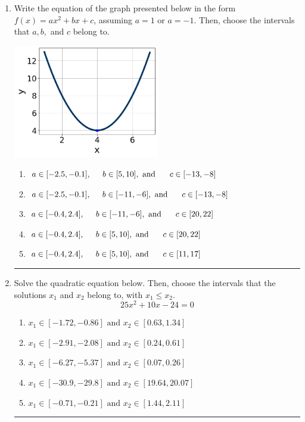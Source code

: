 \documentclass[14pt]{extbook}
\newcommand{\litem}[1]{\item#1\hspace*{-1cm}\rule{\textwidth}{0.4pt}}
\begin{document}
\begin{enumerate}
\litem{
Write the equation of the graph presented below in the form $f(x)=ax^2+bx+c$, assuming  $a=1$ or $a=-1$. Then, choose the intervals that $a, b,$ and $c$ belong to.
\begin{center}
    \includegraphics[width=0.5\textwidth]{../Figures/quadraticGraphToEquationB.png}
\end{center}
\begin{enumerate}[label=\Alph*.]
\item \( a \in [-2.5, -0.1], \hspace*{5mm} b \in [5, 10], \text{ and } \hspace*{5mm} c \in [-13, -8] \)
\item \( a \in [-2.5, -0.1], \hspace*{5mm} b \in [-11, -6], \text{ and } \hspace*{5mm} c \in [-13, -8] \)
\item \( a \in [-0.4, 2.4], \hspace*{5mm} b \in [-11, -6], \text{ and } \hspace*{5mm} c \in [20, 22] \)
\item \( a \in [-0.4, 2.4], \hspace*{5mm} b \in [5, 10], \text{ and } \hspace*{5mm} c \in [20, 22] \)
\item \( a \in [-0.4, 2.4], \hspace*{5mm} b \in [5, 10], \text{ and } \hspace*{5mm} c \in [11, 17] \)

\end{enumerate} }
\litem{
Solve the quadratic equation below. Then, choose the intervals that the solutions $x_1$ and $x_2$ belong to, with $x_1 \leq x_2$.\[ 25x^{2} +10 x -24 = 0 \]\begin{enumerate}[label=\Alph*.]
\item \( x_1 \in [-1.72, -0.86] \text{ and } x_2 \in [0.63, 1.34] \)
\item \( x_1 \in [-2.91, -2.08] \text{ and } x_2 \in [0.24, 0.61] \)
\item \( x_1 \in [-6.27, -5.37] \text{ and } x_2 \in [0.07, 0.26] \)
\item \( x_1 \in [-30.9, -29.8] \text{ and } x_2 \in [19.64, 20.07] \)
\item \( x_1 \in [-0.71, -0.21] \text{ and } x_2 \in [1.44, 2.11] \)


\end{enumerate}}
\end{enumerate}
\end{document}
